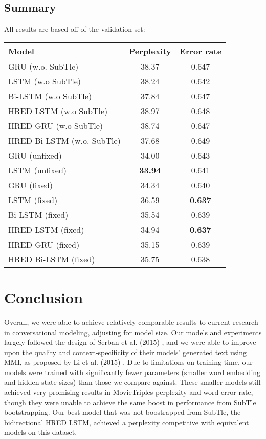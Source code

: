 \documentclass[11pt]{article}
\begin{document}
\subsection{Summary}
All results are based off of the validation set:
\begin{center}
  \begin{tabular}{| l || c | c |}
    \hline
   Model  & Perplexity & Error rate  \\ \hline\hline

     GRU (w.o. SubTle) & 38.37 & 0.647  \\ \hline
     LSTM (w.o SubTle) & 38.24 & 0.642 \\ \hline
     Bi-LSTM (w.o SubTle) & 37.84 & 0.647 \\ \hline
     HRED LSTM  (w.o SubTle) & 38.97 &  0.648  \\ \hline
     HRED GRU  (w.o SubTle) & 38.74 &  0.647  \\ \hline
     HRED Bi-LSTM (w.o. SubTle) & 37.68 & 0.649 \\ \hline
     GRU (unfixed) & 34.00 &  0.643  \\ \hline
     LSTM (unfixed) & \textbf{33.94} &  0.641  \\ \hline
     GRU (fixed) & 34.34 &   0.640 \\ \hline
     LSTM (fixed) & 36.59 &  \textbf{0.637}   \\ \hline
     Bi-LSTM (fixed) & 35.54 &  0.639 \\ \hline
     HRED LSTM (fixed)  & 34.94 &   \textbf{0.637} \\ \hline
     HRED GRU (fixed) & 35.15 &  0.639  \\ \hline
     HRED Bi-LSTM (fixed) & 35.75 &  0.638  \\ \hline

  \end{tabular}
\end{center}

\section{Conclusion}

Overall, we were able to achieve relatively comparable results to current research in conversational modeling, adjusting for model size. Our models and experiments largely followed the design of Serban et al. (2015) \cite{serban}, and we were able to improve upon the quality and context-specificity of their models' generated text using MMI, as proposed by Li et al. (2015) \cite{li}. Due to limitations on training time, our models were trained with significantly fewer parameters (smaller word embedding and hidden state sizes) than those we compare against. These smaller models still achieved very promising results in MovieTriples perplexity and word error rate, though they were unable to achieve the same boost in performance from SubTle bootstrapping. Our best model that was not boostrapped from SubTle, the bidirectional HRED LSTM, achieved a perplexity competitive with equivalent models on this dataset.\\
\end{document}
